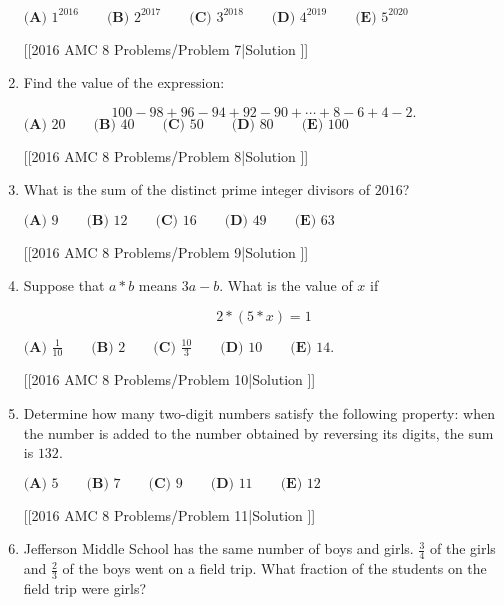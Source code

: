 \documentclass{article}
\begin{document}
\begin{enumerate}[label=\arabic*., itemsep=0.5em]
\(\textbf{(A) }1^{2016}\qquad\textbf{(B) }2^{2017}\qquad\textbf{(C) }3^{2018}\qquad\textbf{(D) }4^{2019}\qquad \textbf{(E) }5^{2020}\)

[[2016 AMC 8 Problems/Problem 7|Solution
]]\par \vspace{0.5em}\item Find the value of the expression:

\begin{equation*}
100-98+96-94+92-90+\cdots+8-6+4-2.
\end{equation*}
\(\textbf{(A) }20\qquad\textbf{(B) }40\qquad\textbf{(C) }50\qquad\textbf{(D) }80\qquad \textbf{(E) }100\)

[[2016 AMC 8 Problems/Problem 8|Solution
]]\par \vspace{0.5em}\item What is the sum of the distinct prime integer divisors of \(2016\)?

\(\textbf{(A) }9\qquad\textbf{(B) }12\qquad\textbf{(C) }16\qquad\textbf{(D) }49\qquad \textbf{(E) }63\)

[[2016 AMC 8 Problems/Problem 9|Solution
]]\par \vspace{0.5em}\item Suppose that \(a * b\) means \(3a-b.\) What is the value of \(x\) if

\begin{equation*}
2 * (5 * x)=1
\end{equation*}

\(\textbf{(A) }\frac{1}{10} \qquad\textbf{(B) }2\qquad\textbf{(C) }\frac{10}{3} \qquad\textbf{(D) }10\qquad \textbf{(E) }14.\)

[[2016 AMC 8 Problems/Problem 10|Solution
]]\par \vspace{0.5em}\item Determine how many two-digit numbers satisfy the following property: when the number is added to the number obtained by reversing its digits, the sum is \(132.\)

\(\textbf{(A) }5\qquad\textbf{(B) }7\qquad\textbf{(C) }9\qquad\textbf{(D) }11\qquad \textbf{(E) }12\)

[[2016 AMC 8 Problems/Problem 11|Solution
]]\par \vspace{0.5em}\item Jefferson Middle School has the same number of boys and girls. \(\frac{3}{4}\) of the girls and \(\frac{2}{3}\)
of the boys went on a field trip. What fraction of the students on the field trip were girls?


\end{enumerate}
\end{document}
